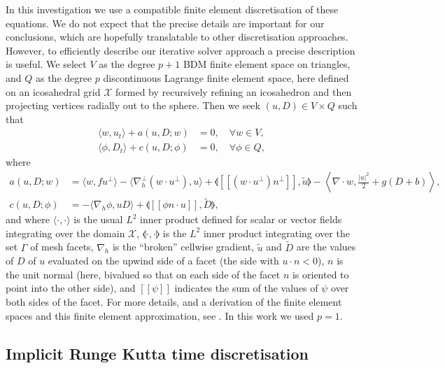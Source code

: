 \documentclass[a4paper, 12pt]{article}
\newcommand{\jump}[1]{[\![#1]\!]}
\begin{document}
In this investigation we use a compatible finite element
discretisation of these equations. We do not expect that the precise
details are important for our conclusions, which are hopefully
translatable to other discretisation approaches. However, to
efficiently describe our iterative solver approach a precise
description is useful. We select $V$ as the degree $p+1$ BDM finite
element space on triangles, and $Q$ as the degree $p$ discontinuous
Lagrange finite element space, here defined on an icosahedral grid
$\mathcal{X}$ formed by recursively refining an icosahedron and then projecting
vertices radially out to the sphere. Then we seek $(u,D)\in V\times Q$
such that
\begin{align}
  \label{eq:ut}
  \langle w, u_t \rangle + a(u,D;w) 
   & = 0,
  \quad \forall w \in V, \\
  \label{eq:Dt}
  \langle \phi, D_t \rangle
+ c(u,D; \phi) & =
 0, \quad \forall \phi \in Q,
\end{align}
where
\begin{align}
   a(u,D;w) 
&=
  \langle w, fu^\perp \rangle 
  - \langle \nabla_h^\perp (w\cdot u^\perp), u \rangle
  + \llangle \jump{(w\cdot u^\perp) n^\perp}, \tilde{u} \rrangle  - \left\langle \nabla\cdot w, \frac{|u|^2}{2} + g(D+b) \right\rangle, \\
  c(u,D; \phi) &=
  - \langle \nabla_h \phi, uD \rangle
  + \llangle \jump{\phi n\cdot u}, \tilde{D} \rrangle,
\end{align}
and where $\langle \cdot , \cdot \rangle$ is the usual $L^2$ inner
product defined for scalar or vector fields integrating over the
domain $\mathcal{X}$, $\llangle\cdot,\cdot \rrangle$ is the $L^2$
inner product integrating over the set $\Gamma$ of mesh facets,
$\nabla_h$ is the ``broken'' cellwise gradient, $\tilde{u}$ and
$\tilde{D}$ are the values of $D$ of $u$ evaluated on the upwind side
of a facet (the side with $u\cdot n<0$), $n$ is the unit normal (here,
bivalued so that on each side of the facet $n$ is oriented to point
into the other side), and $\jump{\psi}$ indicates the sum of the
values of $\psi$ over both sides of the facet. For more details, and a
derivation of the finite element spaces and this finite element
approximation, see \cite{gibson2019compatible}. In this work we used
$p=1$.

\subsection{Implicit Runge Kutta time discretisation}
\end{document}
